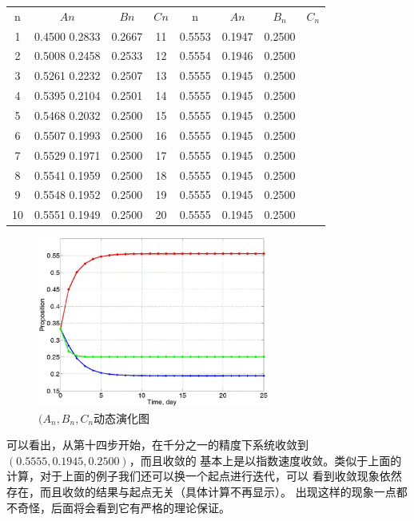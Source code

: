\begin{table}
\centering
\begin{tabular}{|cccc|cccc|}
\hline
n &  $An$ & $Bn$ & $Cn$ & n &  $An$ & $B_n$ & $C_n$\\
1  & 0.4500  0.2833 & 0.2667 & 11 & 0.5553 & 0.1947 & 0.2500\\
2  & 0.5008  0.2458 & 0.2533 & 12 & 0.5554 & 0.1946 & 0.2500\\
3  & 0.5261  0.2232 & 0.2507 & 13 & 0.5555 & 0.1945 & 0.2500\\
4  & 0.5395  0.2104 & 0.2501 & 14 & 0.5555 & 0.1945 & 0.2500\\
5  & 0.5468  0.2032 & 0.2500 & 15 & 0.5555 & 0.1945 & 0.2500\\
6  & 0.5507  0.1993 & 0.2500 & 16 & 0.5555 & 0.1945 & 0.2500\\
7  & 0.5529  0.1971 & 0.2500 & 17 & 0.5555 & 0.1945 & 0.2500\\
8  & 0.5541  0.1959 & 0.2500 & 18 & 0.5555 & 0.1945 & 0.2500\\
9  & 0.5548  0.1952 & 0.2500 & 19 & 0.5555 & 0.1945 & 0.2500\\
10 & 0.5551  0.1949 & 0.2500 & 20 & 0.5555 & 0.1945 & 0.2500\\
\hline
\end{tabular}
\end{table}

\begin{figure}[ht]
\centering
\includegraphics[width=3in]{DynamicsNumber.eps}
\caption{$(A_n,B_n,C_n$动态演化图} \label{Fig:DynamicsNumber}
\end{figure}
可以看出，从第十四步开始，在千分之一的精度下系统收敛到$(0.5555,0.1945,0.2500)$，而且收敛的
基本上是以指数速度收敛。类似于上面的计算，对于上面的例子我们还可以换一个起点进行迭代，可以
看到收敛现象依然存在，而且收敛的结果与起点无关（具体计算不再显示）。
出现这样的现象一点都不奇怪，后面将会看到它有严格的理论保证。


